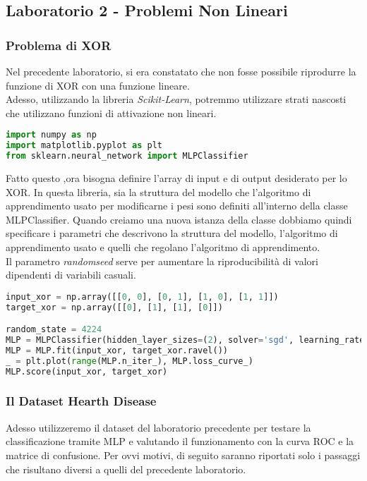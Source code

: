 \documentclass[12pt, a4paper]{article}
\begin{document}
\subsection{Laboratorio 2 - Problemi Non Lineari}
\subsubsection{Problema di XOR}
Nel precedente laboratorio, si era constatato che non fosse possibile riprodurre la funzione di XOR con una funzione lineare.\\
Adesso, utilizzando la libreria \textit{Scikit-Learn}, potremmo utilizzare strati nascosti che utilizzano funzioni di attivazione non lineari.

\begin{lstlisting}[language=Python, caption=Importazione delle Librerie Necessarie]
import numpy as np 
import matplotlib.pyplot as plt
from sklearn.neural_network import MLPClassifier   
\end{lstlisting}

Fatto questo ,ora bisogna definire l'array di input e di output desiderato per lo XOR.
In questa libreria, sia la struttura del modello che l'algoritmo di apprendimento usato per modificarne i pesi sono definiti all'interno della classe MLPClassifier. Quando creiamo una nuova istanza della classe dobbiamo quindi specificare i parametri che descrivono la struttura del modello, l'algoritmo di apprendimento usato e quelli che regolano l'algoritmo di apprendimento.\\
Il parametro \textit{random\textunderscore seed} serve per aumentare la riproducibilità di valori dipendenti di variabili casuali.

\begin{lstlisting}[language=Python, caption=Inizializzazione]
input_xor = np.array([[0, 0], [0, 1], [1, 0], [1, 1]])
target_xor = np.array([[0], [1], [1], [0]])    

random_state = 4224
MLP = MLPClassifier(hidden_layer_sizes=(2), solver='sgd', learning_rate_init=0.05, max_iter=10000, random_state=random_state)
MLP = MLP.fit(input_xor, target_xor.ravel())
_ = plt.plot(range(MLP.n_iter_), MLP.loss_curve_)
MLP.score(input_xor, target_xor)
\end{lstlisting}

\subsubsection{Il Dataset Hearth Disease}
Adesso utilizzeremo il dataset del laboratorio precedente per testare la classificazione tramite MLP e valutando il funzionamento con la curva ROC e la matrice di confusione.
Per ovvi motivi, di seguito saranno riportati solo i passaggi che risultano diversi a quelli del precedente laboratorio.
\end{document}
